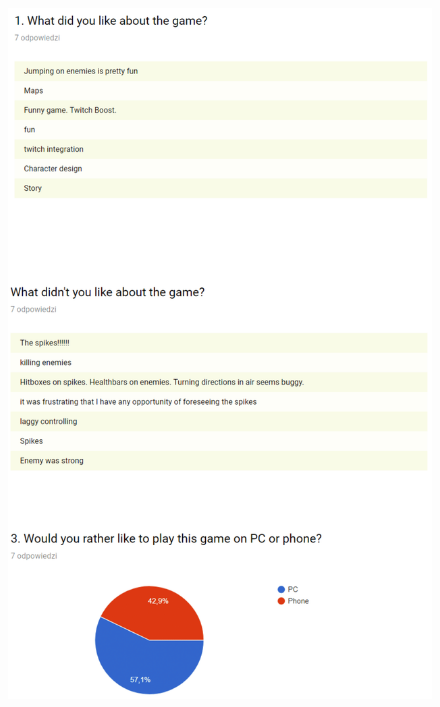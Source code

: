 \documentclass[12p]{article}
\begin{document}
\begin{figure}[ht]
 \center
 \includegraphics[width=\textwidth,height=\textheight,keepaspectratio]{surveyresults1.png}
 \label{fig:survey_results_1}
\end{figure}
\end{document}
